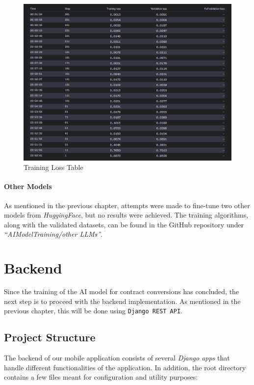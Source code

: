 \begin{figure}[!ht]
    \centering
    \includegraphics[width=1\textwidth]{LATEX/Appendices/Images/Software/AI Model/training_validation_loss_table.png}
    \caption{Training Loss Table}
    \label{fig:training_loss_table}
\end{figure}

\paragraph{Other Models}

As mentioned in the previous chapter, attempts were made to fine-tune two other models from \textit{HuggingFace}, but no results were achieved. The training algorithms, along with the validated datasets, can be found in the GitHub repository under \textit{``AIModelTraining/other LLMs''}.

\section{Backend}

Since the training of the AI model for contract conversions has concluded, the next step is to proceed with the backend implementation. As mentioned in the previous chapter, this will be done using \texttt{Django REST API}. 

\subsection{Project Structure}

The backend of our mobile application consists of several \textit{Django apps} that handle different functionalities of the application. In addition, the root directory contains a few files meant for configuration and utility purposes:

